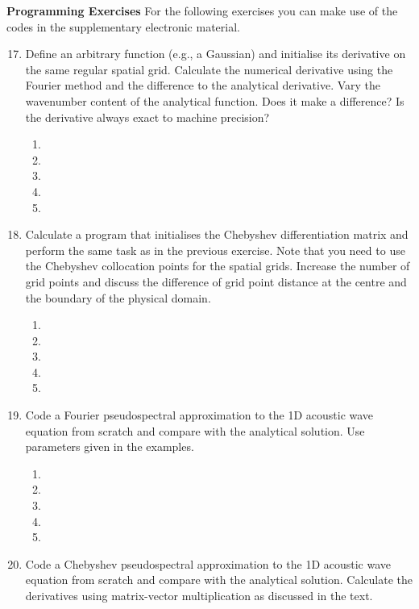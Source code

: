 {\bf Programming Exercises}
For the following exercises you can make use of the codes in the supplementary electronic material. 
\begin{enumerate}
\setcounter{enumi}{16}
\item
Define an arbitrary function (e.g., a Gaussian) and initialise its derivative on the same regular spatial grid. Calculate the numerical derivative using the Fourier method and the difference to the analytical derivative. Vary the wavenumber content of the analytical function. Does it make a difference? Is the derivative always exact to machine precision?
\begin{enumerate}
\item[]
\item[]
\item[] 
\item[]
\item[] 
\end{enumerate}
\item
Calculate a program that initialises the Chebyshev differentiation matrix and perform the same task as in the previous exercise. Note that you need to use the Chebyshev collocation points for the spatial grids. Increase the number of grid points and discuss the difference of grid point distance at the centre and the boundary of the physical domain. 
\begin{enumerate}
\item[]
\item[]
\item[] 
\item[]
\item[] 
\end{enumerate}
\item
Code a Fourier pseudospectral approximation to the  1D acoustic wave equation from scratch and compare with the analytical solution. Use parameters given in the examples. 
\begin{enumerate}
\item[]
\item[]
\item[] 
\item[]
\item[] 
\end{enumerate}
\item
Code a Chebyshev pseudospectral approximation to the 1D acoustic wave equation from scratch and compare with the analytical solution. Calculate the derivatives using matrix-vector multiplication as discussed in the text. 

\end{enumerate}
